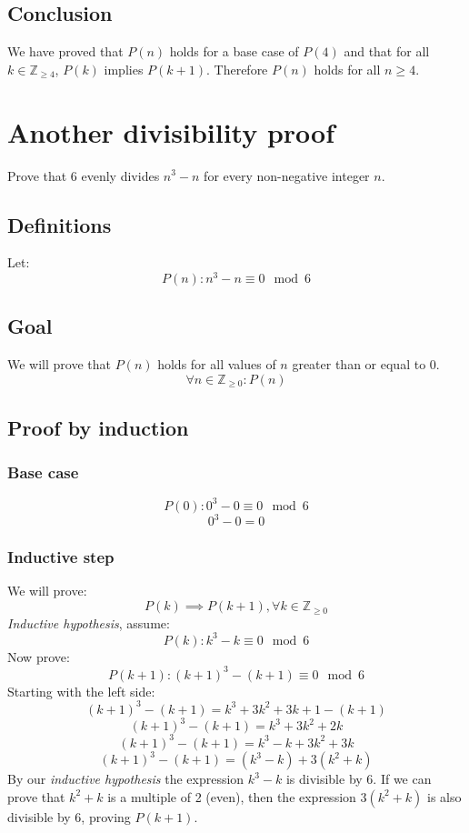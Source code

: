 \documentclass{article}
\begin{document}
\subsection{Conclusion}
We have proved that $P(n)$ holds for a base case of $P(4)$ and that for all $k \in \mathbb Z_{\geq 4}$, $P(k)$ implies $P(k + 1)$. Therefore $P(n)$ holds for all $n \geq 4$.


\section{Another divisibility proof}
Prove that 6 evenly divides \( n^3 - n \) for every non-negative integer $n$.
\subsection{Definitions}
Let:
\begin{equation}
P(n): n^3 - n \equiv 0 \mod 6
\end{equation}

\subsection{Goal}
We will prove that $P(n)$ holds for all values of $n$ greater than or equal to 0.
\begin{equation}
\forall n \in \mathbb Z_{\ge 0} : P(n)
\end{equation}

\subsection{Proof by induction}
\subsubsection{Base case}
\begin{equation}
P(0): 0^3 - 0 \equiv 0 \mod 6
\end{equation}
\[ 0^3 - 0 = 0 \]

\subsubsection{Inductive step}
We will prove:
\begin{equation}
P(k) \implies P(k + 1), \forall k \in \mathbb Z_{\geq 0}
\end{equation}
\textit{Inductive hypothesis}, assume:
\begin{equation}
P(k): k^3 - k \equiv 0 \mod 6
\end{equation}
Now prove:
\begin{equation}
P(k + 1): (k + 1)^3 - (k + 1) \equiv 0 \mod 6
\end{equation}
Starting with the left side:
\[ (k + 1)^3 - (k + 1) = k^3 + 3k^2 + 3k + 1 - (k + 1)\]
\[ (k + 1)^3 - (k + 1) = k^3 + 3k^2 + 2k \]
\[ (k + 1)^3 - (k + 1) = k^3 - k + 3k^2 + 3k \]
\[ (k + 1)^3 - (k + 1) = (k^3 - k) + 3(k^2 + k) \]
By our \textit{inductive hypothesis} the expression $k^3 - k$ is divisible by 6. If we can prove that $k^2 + k$ is a multiple of 2 (even), then the expression $3(k^2 + k)$ is also divisible by 6, proving $P(k + 1)$.
\end{document}
